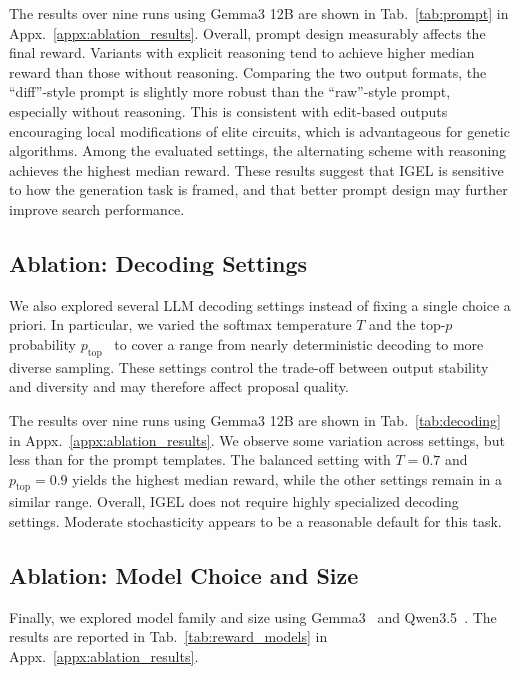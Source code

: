 \documentclass[sigconf,pbalance]{acmart_modified}
\newcommand{\squeezeSubSection}{}
\begin{document}
The results over nine runs using Gemma3 12B are shown in Tab.~\ref{tab:prompt} in Appx.~\ref{appx:ablation_results}. Overall, prompt design measurably affects the final reward. Variants with explicit reasoning tend to achieve higher median reward than those without reasoning. Comparing the two output formats, the ``diff''-style prompt is slightly more robust than the ``raw''-style prompt, especially without reasoning. This is consistent with edit-based outputs encouraging local modifications of elite circuits, which is advantageous for genetic algorithms. Among the evaluated settings, the alternating scheme with reasoning achieves the highest median reward. These results suggest that IGEL is sensitive to how the generation task is framed, and that better prompt design may further improve search performance.

\squeezeSubSection\subsection{Ablation: Decoding Settings}
\label{subsec:decoding:sec:results}
We also explored several LLM decoding settings instead of fixing a single choice a priori. In particular, we varied the softmax temperature $T$ and the top-$p$ probability $p_\text{top}$~\cite{DBLP:conf/iclr/HoltzmanBDFC20} to cover a range from nearly deterministic decoding to more diverse sampling. These settings control the trade-off between output stability and diversity and may therefore affect proposal quality.

The results over nine runs using Gemma3 12B are shown in Tab.~\ref{tab:decoding} in Appx.~\ref{appx:ablation_results}. We observe some variation across settings, but less than for the prompt templates. The balanced setting with $T=0.7$ and $p_\text{top}=0.9$ yields the highest median reward, while the other settings remain in a similar range. Overall, IGEL does not require highly specialized decoding settings. Moderate stochasticity appears to be a reasonable default for this task.

\squeezeSubSection\subsection{Ablation: Model Choice and Size}
\label{subsec:model:sec:results}
Finally, we explored model family and size using Gemma3~\cite{gemma3_technical_report_2025} and Qwen3.5~\cite{qwen3_5_2026}. The results are reported in Tab.~\ref{tab:reward_models} in Appx.~\ref{appx:ablation_results}.
\end{document}
